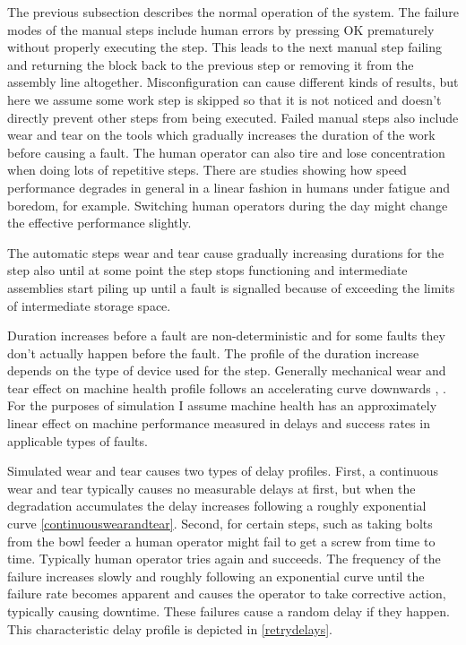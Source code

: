 \documentclass[journal]{IEEEtran}
\begin{document}
The previous subsection describes the normal operation of the system. The failure modes of the manual steps include human errors by pressing OK
prematurely without properly executing the step. This leads to the next manual step failing and returning the block back to the previous step or
removing it from the assembly line altogether. Misconfiguration can cause different kinds of results, but here we assume some work step is skipped
so that it is not noticed and doesn't directly prevent other steps from being executed. Failed manual steps also include wear and tear
on the tools which gradually increases the duration of the work before causing a fault. The human operator can also tire and lose concentration
when doing lots of repetitive steps. There are studies showing how speed performance degrades in general in a linear fashion in humans
under fatigue and boredom, for example\cite{fatigue}. Switching human operators during the day might change the effective performance slightly.

The automatic steps wear and tear cause gradually increasing durations for the step also until at some point the step stops functioning and
intermediate assemblies start piling up until a fault is signalled because of exceeding the limits of intermediate storage space.

Duration increases before a fault are non-deterministic and for some faults they don't actually happen before the fault. The profile of the duration
increase depends on the type of device used for the step. Generally mechanical wear and tear effect on machine health profile follows
an accelerating curve downwards \cite{eker2012major}, \cite{milldataset}. For the purposes of simulation I assume machine health has an approximately
linear effect on machine performance measured in delays and success rates in applicable types of faults.

Simulated wear and tear causes two types of delay profiles. First,
a continuous wear and tear typically causes no measurable delays at first, but when the degradation accumulates the delay increases following
a roughly exponential curve \ref{continuouswearandtear}. Second, for certain steps, such as taking bolts from the bowl feeder a human operator
might fail to get a screw from time to time. Typically human operator tries again and succeeds. The frequency of the failure increases
slowly and roughly following an exponential curve until the failure rate becomes apparent and causes the operator to take corrective action,
typically causing downtime. These failures cause a random delay if they happen. This characteristic delay profile is depicted in \ref{retrydelays}.
\end{document}
